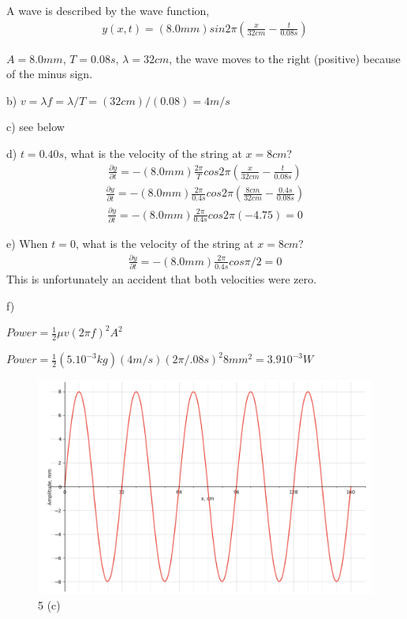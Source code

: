 \documentclass[10pt]{article}
\newenvironment{problem}[2][Problem]{\begin{trivlist}
\item[\hskip \labelsep {\bfseries #1}\hskip \labelsep {\bfseries #2.}]}{\end{trivlist}}
\begin{document}
\begin{problem}{5}
A wave is described by the wave function,
\begin{align}
y(x, t) = (8.0mm) sin 2 \pi \left( \frac{x}{32cm} - \frac{t}{0.08s}\right) \nonumber
\end{align}
\item $A = 8.0mm$, $T = 0.08s$, $\lambda=32cm$, the wave moves to the right (positive) because of the minus sign.
\item
b) $v = \lambda f = \lambda / T = (32cm)/(0.08)=4m/s$
\item
c) see below
\item
d) $t=0.40s$, what is the velocity of the string at $x=8cm$?
\begin{align}
\frac{\partial y}{\partial t} = -(8.0mm)\frac{2\pi}{T} cos 2 \pi \left( \frac{x}{32cm} - \frac{t}{0.08s}\right) \nonumber
\end{align}
\begin{align}
\frac{\partial y}{\partial t} = -(8.0mm)\frac{2\pi}{0.4s} cos 2 \pi \left( \frac{8cm}{32cm} - \frac{0.4s}{0.08s}\right) \nonumber
\end{align}
\begin{align}
\frac{\partial y}{\partial t} = -(8.0mm)\frac{2\pi}{0.4s} cos 2 \pi (-4.75)=0\nonumber
\end{align}
\item
e) When $t=0$, what is the velocity of the string at $x=8cm$?
\begin{align}
\frac{\partial y}{\partial t} = -(8.0mm)\frac{2\pi}{0.4s} cos \pi/2 = 0\nonumber
\end{align}
This is unfortunately an accident that both velocities were zero.
\item
f)
\item $Power =  \frac{1}{2}\mu v (2\pi f)^2 A^2$
\item
$Power =  \frac{1}{2} (5.10^{-3}kg)(4 m/s)  (2\pi/.08s)^2 8mm^2 = 3.9 10^{-3} W$

\end{problem}

\begin{figure}[htp]
    \centering
    \includegraphics[width=7in]{wavegraph.png}
    \caption{5 (c)}
    \label{fig:Graph of Wave}
\end{figure}


\end{document}
